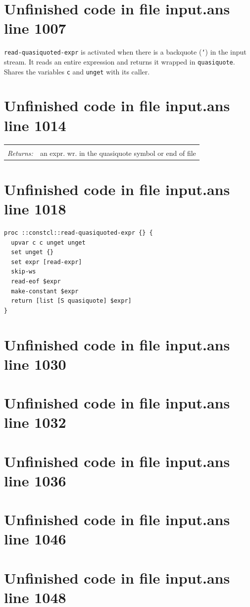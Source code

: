 \documentclass[twoside,9pt]{report}
\begin{document}
\section{Unfinished code in file input.ans line 1007}


\texttt{read-quasiquoted-expr} is activated when there is a backquote (\texttt{`}) in the input stream. It reads an entire expression and returns it wrapped in \texttt{quasiquote}. Shares the variables \texttt{c} and \texttt{unget} with its caller.

\section{Unfinished code in file input.ans line 1014}
\noindent\begin{tabular}{ |p{1.9cm} p{8cm}| }
\hline
\rowcolor[HTML]{CCCCCC} \multicolumn{2}{|l|}{\bf read-quasiquoted-expr (internal)} \\
\textit{Returns:} & an expr. wr. in the quasiquote symbol or end of file \\
\hline
\end{tabular}
\section{Unfinished code in file input.ans line 1018}
\begin{lstlisting}
proc ::constcl::read-quasiquoted-expr {} {
  upvar c c unget unget
  set unget {}
  set expr [read-expr]
  skip-ws
  read-eof $expr
  make-constant $expr
  return [list [S quasiquote] $expr]
}
\end{lstlisting}
\section{Unfinished code in file input.ans line 1030}
\section{Unfinished code in file input.ans line 1032}
\section{Unfinished code in file input.ans line 1036}
\section{Unfinished code in file input.ans line 1046}
\section{Unfinished code in file input.ans line 1048}
\end{document}

